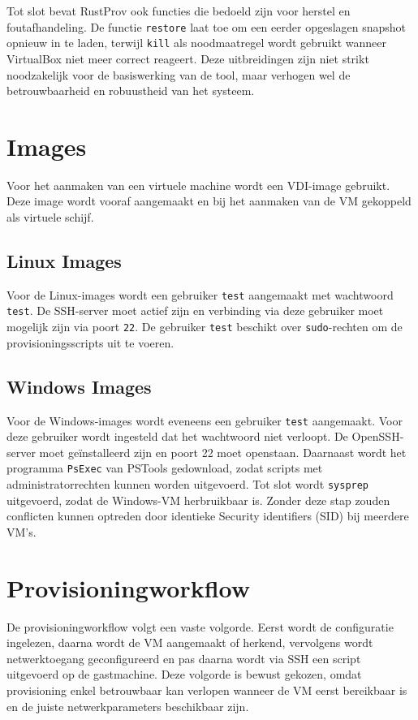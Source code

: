 Tot slot bevat RustProv ook functies die bedoeld zijn voor herstel en foutafhandeling. De functie \texttt{restore} laat toe om een eerder opgeslagen snapshot opnieuw in te laden, terwijl \texttt{kill} als noodmaatregel wordt gebruikt wanneer VirtualBox niet meer correct reageert. Deze uitbreidingen zijn niet strikt noodzakelijk voor de basiswerking van de tool, maar verhogen wel de betrouwbaarheid en robuustheid van het systeem.

\section{Images}

Voor het aanmaken van een virtuele machine wordt een VDI-image gebruikt. Deze image wordt vooraf aangemaakt en bij het aanmaken van de VM gekoppeld als virtuele schijf.

\subsection{Linux Images}

Voor de Linux-images wordt een gebruiker \texttt{test} aangemaakt met wachtwoord \texttt{test}. De SSH-server moet actief zijn en verbinding via deze gebruiker moet mogelijk zijn via poort \texttt{22}. De gebruiker \texttt{test} beschikt over \texttt{sudo}-rechten om de provisioningsscripts uit te voeren.

\subsection{Windows Images}

Voor de Windows-images wordt eveneens een gebruiker \texttt{test} aangemaakt. Voor deze gebruiker wordt ingesteld dat het wachtwoord niet verloopt. De OpenSSH-server moet geïnstalleerd zijn en poort 22 moet openstaan. Daarnaast wordt het programma \texttt{PsExec} van PSTools gedownload, zodat scripts met administratorrechten kunnen worden uitgevoerd. Tot slot wordt \texttt{sysprep} uitgevoerd, zodat de Windows-VM herbruikbaar is. Zonder deze stap zouden conflicten kunnen optreden door identieke Security identifiers (SID) bij meerdere VM's.

\section{Provisioningworkflow}

De provisioningworkflow volgt een vaste volgorde. Eerst wordt de configuratie ingelezen, daarna wordt de VM aangemaakt of herkend, vervolgens wordt netwerktoegang geconfigureerd en pas daarna wordt via SSH een script uitgevoerd op de gastmachine. Deze volgorde is bewust gekozen, omdat provisioning enkel betrouwbaar kan verlopen wanneer de VM eerst bereikbaar is en de juiste netwerkparameters beschikbaar zijn. 

